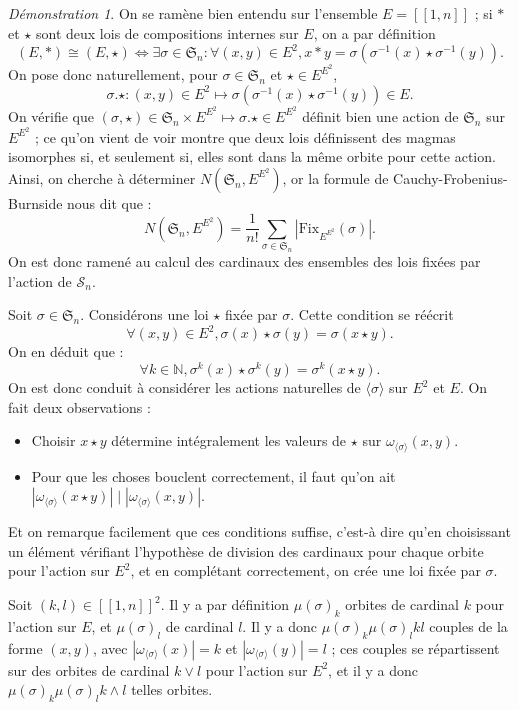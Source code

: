\documentclass{article}
\theoremstyle{definition}
\theoremstyle{remark}
\newtheorem*{demonstration}{Démonstration}
\begin{document}
\begin{demonstration}
    On se ramène bien entendu sur l'ensemble $E=[\![1,n]\!]$ ; si $*$ et $\star$ sont deux lois de compositions internes sur $E$, on a par définition
    $$(E,*)\cong(E,\star)\Leftrightarrow\exists\sigma\in\mathfrak S_n:\forall (x,y)\in E^2,x*y=\sigma(\sigma^{-1}(x)\star\sigma^{-1}(y)).$$
    On pose donc naturellement, pour $\sigma\in\mathfrak S_n$ et $\star\in E^{E^2}$,
    $$\sigma.\star:(x,y)\in E^2\mapsto\sigma(\sigma^{-1}(x)\star\sigma^{-1}(y))\in E.$$
    On vérifie que $(\sigma,\star)\in \mathfrak S_n\times E^{E^2}\mapsto \sigma.\star\in E^{E^2}$ définit bien une action de $\mathfrak S_n$ sur $E^{E^2}$ ; ce qu'on vient de voir montre que deux lois définissent des magmas isomorphes si, et seulement si, elles sont dans la même orbite pour cette action. Ainsi, on cherche à déterminer $N\left(\mathfrak S_n,E^{E^2}\right)$, or la formule de Cauchy-Frobenius-Burnside nous dit que :
    $$N\left(\mathfrak S_n,E^{E^2}\right)=\frac{1}{n!}\sum_{\sigma\in \mathfrak S_n}\left|\mathrm{Fix}_{E^{E^2}}(\sigma)\right|.$$
    On est donc ramené au calcul des cardinaux des ensembles des lois fixées par l'action de $\mathcal S_n$.

    Soit $\sigma\in\mathfrak S_n$. Considérons une loi $\star$ fixée par $\sigma$. Cette condition se réécrit
    $$\forall(x,y)\in E^2, \sigma(x)\star\sigma(y)=\sigma(x\star y).$$
    On en déduit que :
    $$\forall k\in\mathbb N,\sigma^k(x)\star\sigma^k(y)=\sigma^k(x\star y).$$
    On est donc conduit à considérer les actions naturelles de $\langle\sigma\rangle$ sur $E^2$ et $E$. On fait deux observations :
    \begin{itemize}
        \item Choisir $x\star y$ détermine intégralement les valeurs de $\star$ sur $\omega_{\langle\sigma\rangle}(x,y)$.
        \item Pour que les choses bouclent correctement, il faut qu'on ait $|\omega_{\langle\sigma\rangle}(x\star y)|\mid|\omega_{\langle\sigma\rangle}(x,y)|$.
    \end{itemize}
    
    Et on remarque facilement que ces conditions suffise, c'est-à dire qu'en choisissant un élément vérifiant l'hypothèse de division des cardinaux pour chaque orbite pour l'action sur $E^2$, et en complétant correctement, on crée une loi fixée par $\sigma$.

    Soit $(k,l)\in[\![1,n]\!]^2$. Il y a par définition $\mu(\sigma)_k$ orbites de cardinal $k$ pour l'action sur $E$, et $\mu(\sigma)_l$ de cardinal $l$. Il y a donc $\mu(\sigma)_k\mu(\sigma)_lkl$ couples de la forme $(x,y)$, avec $|\omega_{\langle\sigma\rangle}(x)|=k$ et $|\omega_{\langle\sigma\rangle}(y)|=l$ ; ces couples se répartissent sur des orbites de cardinal $k\lor l$ pour l'action sur $E^2$, et il y a donc $\mu(\sigma)_k\mu(\sigma)_lk\land l$ telles orbites.


\end{demonstration}
\end{document}
